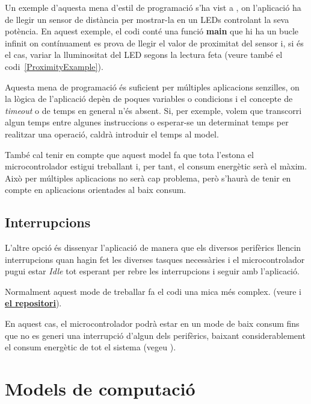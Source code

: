 Un exemple d'aquesta mena d'estil de programació s'ha vist a , on l'aplicació ha de llegir un sensor de distància per mostrar-la en un LEDs controlant la seva potència. En aquest exemple, el codi conté una funció {\bf main} que hi ha un bucle infinit on contínuament es prova de llegir el valor de proximitat del sensor i, si és el cas, variar la lluminositat del LED segons la lectura feta (veure també el codi~\ref{ProximityExample}).

Aquesta mena de programació és suficient per múltiples aplicacions senzilles, on la lògica de l'aplicació depèn de poques variables o condicions i el concepte de {\em timeout} o de temps en general n'és absent. Si, per exemple, volem que transcorri algun temps entre algunes instruccions o esperar-se un determinat temps per realitzar una operació, caldrà introduir el temps al model.

També cal tenir en compte que aquest model fa que tota l'estona el microcontrolador estigui treballant i, per tant, el consum energètic serà el màxim. Això per múltiples aplicacions no serà cap problema, però s'haurà de tenir en compte en aplicacions orientades al baix consum.

\section{Interrupcions}
\label{sec:interrupcions}

L'altre opció és dissenyar l'aplicació de manera que els diversos perifèrics llencin interrupcions quan hagin fet les diverses tasques necessàries i el microcontrolador pugui estar {\em Idle} tot esperant per rebre les interrupcions i seguir amb l'aplicació.

Normalment aquest mode de treballar fa el codi una mica més complex. (veure  i \href{https://github.com/mariusmm/cursembedded/tree/master/Simplicity/GPIO_2}{\bf el repositori}).

En aquest cas, el microcontrolador podrà estar en un mode de baix consum fins que no es generi una interrupció d'algun dels perifèrics, baixant considerablement el consum energètic de tot el sistema (vegeu ).

\chapter{Models de computació}
\label{ch:modescomputacio}

